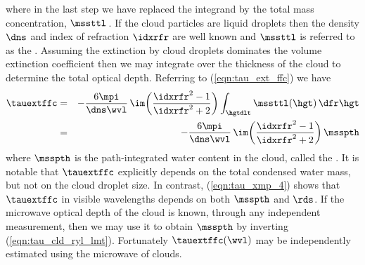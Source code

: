 \documentclass[12pt]{article}
\begin{document}
where in the last step we have replaced the integrand by the total
mass concentration, $\mssttl$\,\kgxmC.  
If the cloud particles are liquid droplets then 
the density $\dns$ and index of refraction $\idxrfr$ are well known
and $\mssttl$ is referred to as the .
Assuming the extinction by cloud droplets dominates the volume
extinction coefficient then we may integrate over the thickness of the
cloud to determine the total optical depth.
Referring to (\ref{eqn:tau_ext_ffc}) we have
\begin{eqnarray} 
\tauextffc
& = & 
-\frac{6\mpi}{\dns \wvl} \, \im \! \left( 
\frac{\idxrfr^{2}-1}{\idxrfr^{2}+2} \right) 
\int_{\hgtdlt} \mssttl(\hgt) \,\dfr\hgt \nonumber \\
& = & 
-\frac{6\mpi}{\dns \wvl} \, \im \! \left( 
\frac{\idxrfr^{2}-1}{\idxrfr^{2}+2} \right) 
\msspth
\label{eqn:tau_cld_ryl_lmt}
\end{eqnarray} 
where $\msspth$ is the path-integrated water content in the cloud,
called the .
It is notable that $\tauextffc$ explicitly depends on the 
total condensed water mass, but not on the cloud droplet size.
In contrast, (\ref{eqn:tau_xmp_4}) shows that $\tauextffc$ in visible 
wavelengths depends on both $\msspth$ and $\rds$.
If the microwave optical depth of the cloud is known, through any
independent measurement, then we may use it to obtain $\msspth$ by
inverting (\ref{eqn:tau_cld_ryl_lmt}).
Fortunately $\tauextffc(\wvl)$ may be independently estimated 
using the microwave  of clouds.
\end{document}
